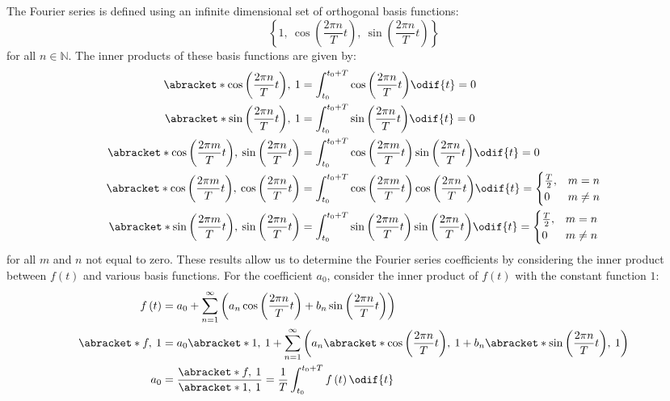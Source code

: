 \documentclass{article}
\begin{document}
The Fourier series is defined using an infinite dimensional set of
orthogonal basis functions:
\begin{equation*}
    \left\{ 1, \: \cos{\left( \frac{2\pi n}{T} t \right)}, \: \sin{\left( \frac{2\pi n}{T} t \right)} \right\}
\end{equation*}
for all \(n \in \mathbb{N}\). The inner products of these basis
functions are given by:
\begin{align*}
    \abracket*{\cos{\left( \frac{2\pi n}{T} t \right)},\: 1}                                       & = \int_{t_0}^{t_0 + T} \cos{\left( \frac{2\pi n}{T} t \right)} \odif{t} = 0                                         \\
    \abracket*{\sin{\left( \frac{2\pi n}{T} t \right)},\: 1}                                       & = \int_{t_0}^{t_0 + T} \sin{\left( \frac{2\pi n}{T} t \right)} \odif{t} = 0                                         \\
    \abracket*{\cos{\left( \frac{2\pi m}{T} t \right)},\: \sin{\left( \frac{2\pi n}{T} t \right)}} & = \int_{t_0}^{t_0 + T} \cos{\left( \frac{2\pi m}{T} t \right)} \sin{\left( \frac{2\pi n}{T} t \right)} \odif{t} = 0 \\
    \abracket*{\cos{\left( \frac{2\pi m}{T} t \right)},\: \cos{\left( \frac{2\pi n}{T} t \right)}} & =
    \int_{t_0}^{t_0 + T} \cos{\left( \frac{2\pi m}{T} t \right)} \cos{\left( \frac{2\pi n}{T} t \right)} \odif{t} =
    \begin{cases}
        \frac{T}{2}, & m = n    \\
        0            & m \neq n
    \end{cases}
    \\
    \abracket*{\sin{\left( \frac{2\pi m}{T} t \right)},\: \sin{\left( \frac{2\pi n}{T} t \right)}} & =
    \int_{t_0}^{t_0 + T} \sin{\left( \frac{2\pi m}{T} t \right)} \sin{\left( \frac{2\pi n}{T} t \right)} \odif{t} =
    \begin{cases}
        \frac{T}{2}, & m = n    \\
        0            & m \neq n
    \end{cases}
\end{align*}
for all \(m\) and \(n\) not equal to zero.
These results allow us to determine the Fourier series coefficients by
considering the inner product between \(f\left( t \right)\) and various
basis functions. For the coefficient \(a_0\), consider the inner product
of \(f\left( t \right)\) with the constant function \(1\):
\begin{align*}
    f\left( t \right)  & = a_0 + \sum_{n=1}^{\infty} \left( a_n \cos{\left( \frac{2\pi n}{T} t \right)} + b_n \sin{\left( \frac{2\pi n}{T} t \right)} \right)                                                      \\
    \abracket*{f,\: 1} & = a_0 \abracket*{1,\: 1} + \sum_{n=1}^{\infty} \left( a_n \abracket*{\cos{\left( \frac{2\pi n}{T} t \right)},\: 1} + b_n \abracket*{\sin{\left( \frac{2\pi n}{T} t \right)},\: 1} \right) \\
    a_0                & = \frac{\abracket*{f,\: 1}}{\abracket*{1,\: 1}} = \frac{1}{T} \int_{t_0}^{t_0 + T} f\left( t \right) \odif{t}
\end{align*}
\end{document}
